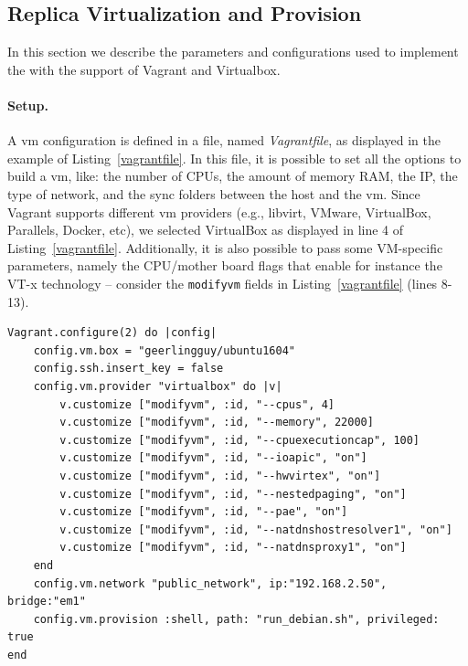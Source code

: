 

\subsection{Replica Virtualization and Provision}
In this section we describe the parameters and configurations used to implement the \manager with the support of Vagrant and Virtualbox.

\paragraph{Setup.}
A \gls{vm} configuration is defined in a file, named \emph{Vagrantfile}, as displayed in the example of Listing~\ref{vagrantfile}.
In this file, it is possible to set all the options to build a \gls{vm}, like:
the number of CPUs, the amount of memory RAM, the IP, the type of network, and the sync folders between the host and the \gls{vm}.
Since Vagrant supports different \gls{vm} providers (e.g., libvirt, VMware, VirtualBox, Parallels, Docker, etc), we selected VirtualBox as displayed in line 4 of Listing~\ref{vagrantfile}.
Additionally, it is also possible to pass some VM-specific parameters, namely the CPU/mother board flags that enable for instance the VT-x technology -- consider the \texttt{modifyvm} fields in Listing~\ref{vagrantfile} (lines 8-13).


\begin{lstlisting}[style=mystyle,caption=Ubuntu 16.04 Vagrantfile,label=vagrantfile]
Vagrant.configure(2) do |config|
	config.vm.box = "geerlingguy/ubuntu1604"
	config.ssh.insert_key = false
	config.vm.provider "virtualbox" do |v|
		v.customize ["modifyvm", :id, "--cpus", 4]
		v.customize ["modifyvm", :id, "--memory", 22000]
		v.customize ["modifyvm", :id, "--cpuexecutioncap", 100]
		v.customize ["modifyvm", :id, "--ioapic", "on"]
		v.customize ["modifyvm", :id, "--hwvirtex", "on"]
		v.customize ["modifyvm", :id, "--nestedpaging", "on"]
		v.customize ["modifyvm", :id, "--pae", "on"]
		v.customize ["modifyvm", :id, "--natdnshostresolver1", "on"]
		v.customize ["modifyvm", :id, "--natdnsproxy1", "on"]
	end
	config.vm.network "public_network", ip:"192.168.2.50", bridge:"em1"
	config.vm.provision :shell, path: "run_debian.sh", privileged: true
end
\end{lstlisting}


